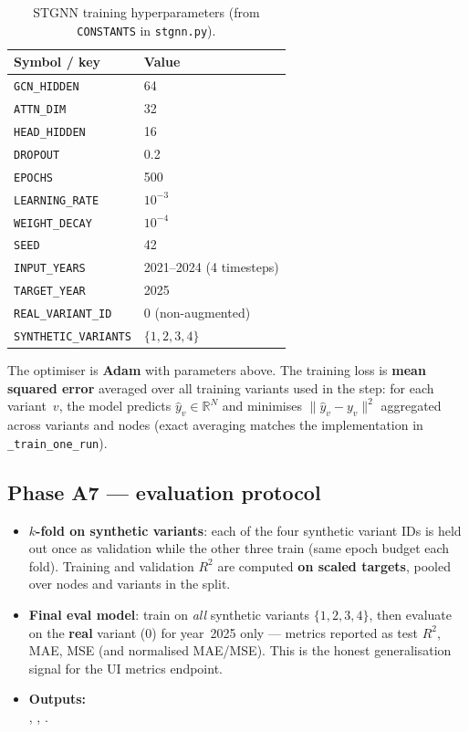 \documentclass[11pt,a4paper]{article}
\begin{document}
\begin{table}[H]
  \centering
  \caption{STGNN training hyperparameters (from \texttt{CONSTANTS} in \texttt{stgnn.py}).}
  \label{tab:stgnn-hparams}
  \begin{tabular}{@{}ll@{}}
    \toprule
    \textbf{Symbol / key} & \textbf{Value} \\
    \midrule
    \texttt{GCN\_HIDDEN} & 64 \\
    \texttt{ATTN\_DIM} & 32 \\
    \texttt{HEAD\_HIDDEN} & 16 \\
    \texttt{DROPOUT} & 0.2 \\
    \texttt{EPOCHS} & 500 \\
    \texttt{LEARNING\_RATE} & $10^{-3}$ \\
    \texttt{WEIGHT\_DECAY} & $10^{-4}$ \\
    \texttt{SEED} & 42 \\
    \texttt{INPUT\_YEARS} & 2021--2024 (4 timesteps) \\
    \texttt{TARGET\_YEAR} & 2025 \\
    \texttt{REAL\_VARIANT\_ID} & 0 (non-augmented) \\
    \texttt{SYNTHETIC\_VARIANTS} & $\{1,2,3,4\}$ \\
    \bottomrule
  \end{tabular}
\end{table}

The optimiser is \textbf{Adam} with parameters above. The training loss is \textbf{mean squared error} averaged over all training variants used in the step: for each variant~$v$, the model predicts $\hat{y}_v \in \mathbb{R}^N$ and minimises $\lVert \hat{y}_v - y_v \rVert^2$ aggregated across variants and nodes (exact averaging matches the implementation in \texttt{\_train\_one\_run}).

\subsection{Phase A7 --- evaluation protocol}
\begin{itemize}
  \item \textbf{$k$-fold on synthetic variants}: each of the four synthetic variant IDs is held out once as validation while the other three train (same epoch budget each fold). Training and validation $R^2$ are computed \textbf{on scaled targets}, pooled over nodes and variants in the split.
  \item \textbf{Final eval model}: train on \emph{all} synthetic variants $\{1,2,3,4\}$, then evaluate on the \textbf{real} variant ($0$) for year~2025 only --- metrics reported as test $R^2$, MAE, MSE (and normalised MAE/MSE). This is the honest generalisation signal for the UI metrics endpoint.
  \item \textbf{Outputs:}\\
        {\small {}, , .}
\end{itemize}
\end{document}
